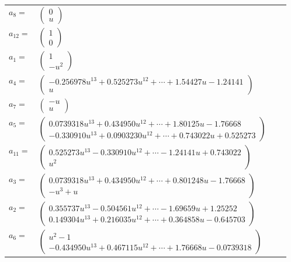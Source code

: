 \documentclass[1p]{elsarticle_modified}
\theoremstyle{definition}
\begin{document}
\begin{tabular}{m{7pt} m{180pt} m{7pt} m{180pt} }
\flushright $a_{8}=$&$\begin{pmatrix}0\\u\end{pmatrix}$ \\
\flushright $a_{12}=$&$\begin{pmatrix}1\\0\end{pmatrix}$ \\
\flushright $a_{1}=$&$\begin{pmatrix}1\\- u^2\end{pmatrix}$ \\
\flushright $a_{4}=$&$\begin{pmatrix}-0.256978 u^{13}+0.525273 u^{12}+\cdots+1.54427 u-1.24141\\u\end{pmatrix}$ \\
\flushright $a_{7}=$&$\begin{pmatrix}- u\\u\end{pmatrix}$ \\
\flushright $a_{5}=$&$\begin{pmatrix}0.0739318 u^{13}+0.434950 u^{12}+\cdots+1.80125 u-1.76668\\-0.330910 u^{13}+0.0903230 u^{12}+\cdots+0.743022 u+0.525273\end{pmatrix}$ \\
\flushright $a_{11}=$&$\begin{pmatrix}0.525273 u^{13}-0.330910 u^{12}+\cdots-1.24141 u+0.743022\\u^2\end{pmatrix}$ \\
\flushright $a_{3}=$&$\begin{pmatrix}0.0739318 u^{13}+0.434950 u^{12}+\cdots+0.801248 u-1.76668\\- u^3+u\end{pmatrix}$ \\
\flushright $a_{2}=$&$\begin{pmatrix}0.355737 u^{13}-0.504561 u^{12}+\cdots-1.69659 u+1.25252\\0.149304 u^{13}+0.216035 u^{12}+\cdots+0.364858 u-0.645703\end{pmatrix}$ \\
\flushright $a_{6}=$&$\begin{pmatrix}u^2-1\\-0.434950 u^{13}+0.467115 u^{12}+\cdots+1.76668 u-0.0739318\end{pmatrix}$ \\

\end{tabular}
\end{document}
